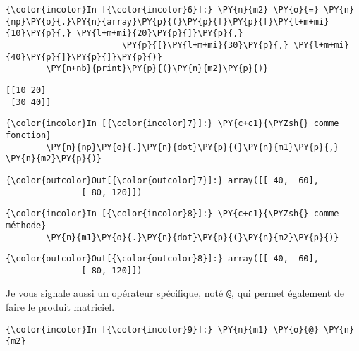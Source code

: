     \begin{Verbatim}[commandchars=\\\{\}]
{\color{incolor}In [{\color{incolor}6}]:} \PY{n}{m2} \PY{o}{=} \PY{n}{np}\PY{o}{.}\PY{n}{array}\PY{p}{(}\PY{p}{[}\PY{p}{[}\PY{l+m+mi}{10}\PY{p}{,} \PY{l+m+mi}{20}\PY{p}{]}\PY{p}{,}
                       \PY{p}{[}\PY{l+m+mi}{30}\PY{p}{,} \PY{l+m+mi}{40}\PY{p}{]}\PY{p}{]}\PY{p}{)}
        \PY{n+nb}{print}\PY{p}{(}\PY{n}{m2}\PY{p}{)}
\end{Verbatim}


    \begin{Verbatim}[commandchars=\\\{\}]
[[10 20]
 [30 40]]

    \end{Verbatim}

    \begin{Verbatim}[commandchars=\\\{\}]
{\color{incolor}In [{\color{incolor}7}]:} \PY{c+c1}{\PYZsh{} comme fonction}
        \PY{n}{np}\PY{o}{.}\PY{n}{dot}\PY{p}{(}\PY{n}{m1}\PY{p}{,} \PY{n}{m2}\PY{p}{)}
\end{Verbatim}


\begin{Verbatim}[commandchars=\\\{\}]
{\color{outcolor}Out[{\color{outcolor}7}]:} array([[ 40,  60],
               [ 80, 120]])
\end{Verbatim}
            
    \begin{Verbatim}[commandchars=\\\{\}]
{\color{incolor}In [{\color{incolor}8}]:} \PY{c+c1}{\PYZsh{} comme méthode}
        \PY{n}{m1}\PY{o}{.}\PY{n}{dot}\PY{p}{(}\PY{n}{m2}\PY{p}{)}
\end{Verbatim}


\begin{Verbatim}[commandchars=\\\{\}]
{\color{outcolor}Out[{\color{outcolor}8}]:} array([[ 40,  60],
               [ 80, 120]])
\end{Verbatim}
            
    Je vous signale aussi un opérateur spécifique, noté \texttt{@}, qui
permet également de faire le produit matriciel.

    \begin{Verbatim}[commandchars=\\\{\}]
{\color{incolor}In [{\color{incolor}9}]:} \PY{n}{m1} \PY{o}{@} \PY{n}{m2}
\end{Verbatim}



